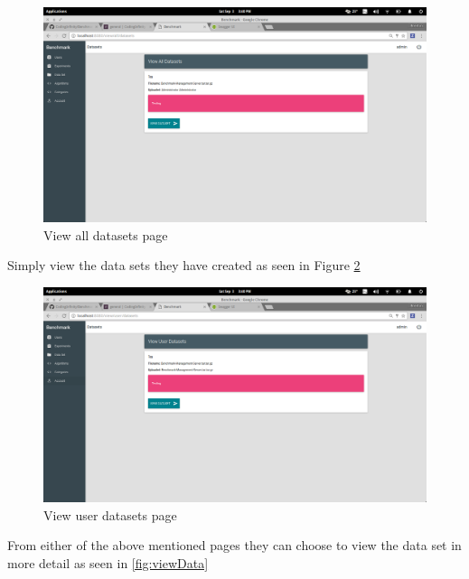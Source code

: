 \documentclass[11pt,a4paper]{article}
\begin{document}
\begin{figure}[H]
	\begin{center}
		\includegraphics[scale=0.3]{../Images/User Manual/View All Datasets.png}
		\caption{View all datasets page}
		\label{fig:viewAllData}
	\end{center}  
\end{figure}
\clearpage
Simply view the data sets they have created as seen in Figure \ref{fig:viewUserData}
\begin{figure}[H]
	\begin{center}
		\includegraphics[scale=0.3]{../Images/User Manual/View User Datasets.png}
		\caption{View user datasets page}
		\label{fig:viewUserData}
	\end{center}  
\end{figure}
\clearpage 
From either of the above mentioned pages they can choose to view the data set in more
detail as seen in \ref{fig:viewData}
\end{document}
